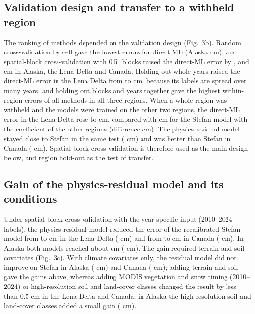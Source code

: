 \subsection{Validation design and transfer to a withheld region}
The ranking of methods depended on the validation design (Fig.~3b). Random cross-validation by cell gave the lowest errors for direct ML (Alaska \nrmseAkrandDz{} cm), and spatial-block cross-validation with 0.5$^\circ$ blocks raised the direct-ML error by \noptimAkDz, \noptimLeDz{} and \noptimCaDz{} cm in Alaska, the Lena Delta and Canada. Holding out whole years raised the direct-ML error in the Lena Delta from \nrmseLeblkDz{} to \nrmseLeyrDz{} cm, because its labels are spread over many years, and holding out blocks and years together gave the highest within-region errors of all methods in all three regions. When a whole region was withheld and the models were trained on the other two regions, the direct-ML error in the Lena Delta rose to \nrmseLeregDz{} cm, compared with \nrmseLeregPz{} cm for the Stefan model with the coefficient of the other regions (difference \ndrefLeregDz{} cm). The physics-residual model stayed close to Stefan in the same test (\ndrefLeregRo{} cm) and was better than Stefan in Canada (\ndrefCaregRo{} cm). Spatial-block cross-validation is therefore used as the main design below, and region hold-out as the test of transfer.

\subsection{Gain of the physics-residual model and its conditions}
Under spatial-block cross-validation with the year-specific input (2010--2024 labels), the physics-residual model reduced the error of the recalibrated Stefan model from \nrmseLeblkPo{} to \nrmseLeblkRo{} cm in the Lena Delta (\ndrefLeblkRo{} cm) and from \nrmseCablkPo{} to \nrmseCablkRo{} cm in Canada (\ndrefCablkRo{} cm). In Alaska both models reached about \nrmseAkblkRo{} cm (\ndrefAkblkRo{} cm). The gain required terrain and soil covariates (Fig.~3c). With climate covariates only, the residual model did not improve on Stefan in Alaska (\ndfeatAkFclim{} cm) and Canada (\ndfeatCaFclim{} cm); adding terrain and soil gave the gains above, whereas adding MODIS vegetation and snow timing (2010--2024) or high-resolution soil and land-cover classes changed the result by less than 0.5 cm in the Lena Delta and Canada; in Alaska the high-resolution soil and land-cover classes added a small gain (\ndfeatAkFhires{} cm).

